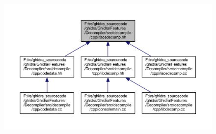 \begin{figure}[H]
\begin{center}
\leavevmode
\includegraphics[width=350pt]{ifacedecomp_8hh__dep__incl}
\end{center}
\end{figure}
